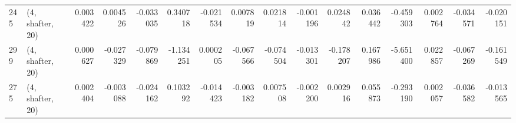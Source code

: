 \begin{tabular}{llrrrrrrrrrrrrrr}
245 &  (4, shafter, 20) &   0.003422 &  0.004526 & -0.033035 &    0.340718 & -0.021534 &   0.007819 &  0.021814 & -0.001196 &  0.024842 &  0.036442 &   -0.459303 &  0.002764 & -0.034571 & -0.020151 \\
299 &  (4, shafter, 20) &   0.000627 & -0.027329 & -0.079869 &   -1.134251 &  0.000205 &  -0.067566 & -0.074504 & -0.013301 & -0.178207 &  0.167986 &   -5.651400 &  0.022857 & -0.067269 & -0.161549 \\
275 &  (4, shafter, 20) &   0.002404 & -0.003088 & -0.024162 &    0.103292 & -0.014423 &  -0.003182 &  0.007508 & -0.002200 &  0.002916 &  0.055873 &   -0.293190 &  0.002057 & -0.036582 & -0.013565 \\
\bottomrule
\end{tabular}
